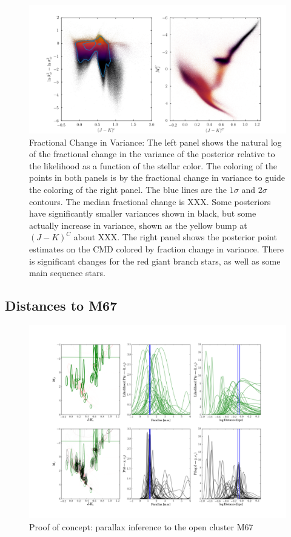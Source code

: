 \documentclass[modern]{aastex61}
\begin{document}
\begin{figure}
\centering
\includegraphics[width=\textwidth]{delta.png}
\caption{Fractional Change in Variance: The left panel shows the natural log of the fractional change in the variance of the posterior relative to the likelihood as a function of the stellar color. The coloring of the points in both panels is by the fractional change in variance to guide the coloring of the right panel. The blue lines are the $1\sigma$ and $2\sigma$ contours. The median fractional change is XXX. Some posteriors have significantly smaller variances shown in black, but some actually increase in variance, shown as the yellow bump at $(J-K)^C$ about XXX. The right panel shows the posterior point estimates on the CMD colored by fraction change in variance. There is significant changes for the red giant branch stars, as well as some main sequence stars.}
\label{fig:delta}
\end{figure}


\subsection{Distances to M67}
\begin{figure}
\centering
  \includegraphics[width=\textwidth]{distancesM67.png}
\caption{Proof of concept: parallax inference to the open cluster M67}
\label{fig:m67}
\end{figure}
\end{document}
